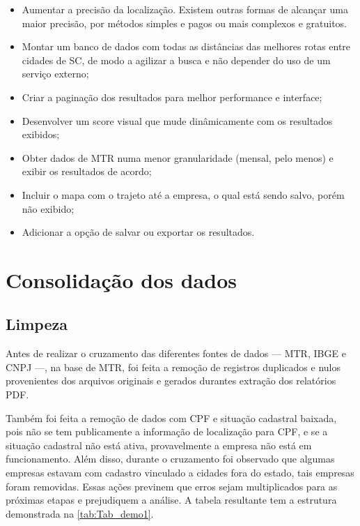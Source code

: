 \begin{itemize} 
	\item Aumentar a precisão da localização. Existem outras formas de alcançar uma maior precisão, por métodos simples e pagos ou mais complexos e gratuitos.
  \item Montar um banco de dados com todas as distâncias das melhores rotas entre cidades de SC, de modo a agilizar a busca e não depender do uso de um serviço externo;
  \item Criar a paginação dos resultados para melhor performance e interface;
  \item Desenvolver um score visual que mude dinâmicamente com os resultados exibidos;
  \item Obter dados de \gls{MTR} numa menor granularidade (mensal, pelo menos) e exibir os resultados de acordo;
  \item Incluir o mapa com o trajeto até a empresa, o qual está sendo salvo, porém não exibido;
  \item Adicionar a opção de salvar ou exportar os resultados.
\end{itemize}

\section{Consolidação dos dados}\label{section:consolida}

\subsection{Limpeza}

Antes de realizar o cruzamento das diferentes fontes de dados — \gls{MTR}, \gls{IBGE} e \gls{CNPJ} —, na base de \gls{MTR}, foi feita a remoção de registros duplicados e nulos provenientes dos arquivos originais e gerados durantes extração dos relatórios \gls{PDF}. 

Também foi feita a remoção de dados com \gls{CPF} e situação cadastral baixada, pois não se tem publicamente a informação de localização para \gls{CPF}, e se a situação cadastral não está ativa, provavelmente a empresa não está em funcionamento. Além disso, durante o cruzamento foi observado que algumas empresas estavam com cadastro vinculado a cidades fora do estado, tais empresas foram removidas. Essas ações previnem que erros sejam multiplicados para as próximas etapas e prejudiquem a análise. A tabela resultante tem a estrutura demonstrada na \autoref{tab:Tab_demo1}.

